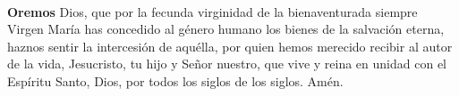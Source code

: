 \\[2mm]
\textbf{Oremos}
 Dios, que por la fecunda virginidad de la bienaventurada siempre Virgen María has concedido al género humano los bienes de la salvación eterna, haznos sentir
la intercesión de aquélla, por quien hemos merecido recibir al autor de la vida, Jesucristo, tu hijo y Señor nuestro, que vive y reina en unidad con el Espíritu Santo, Dios, por
todos los siglos de los siglos. Amén.